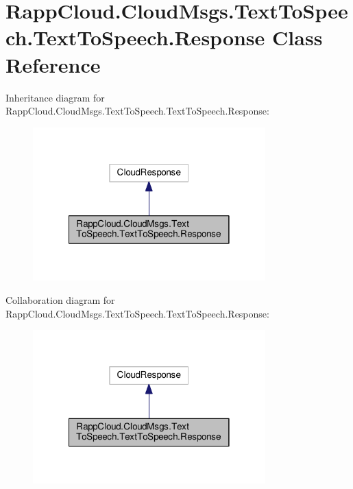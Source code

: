 \hypertarget{classRappCloud_1_1CloudMsgs_1_1TextToSpeech_1_1TextToSpeech_1_1Response}{\section{Rapp\-Cloud.\-Cloud\-Msgs.\-Text\-To\-Speech.\-Text\-To\-Speech.\-Response Class Reference}
\label{classRappCloud_1_1CloudMsgs_1_1TextToSpeech_1_1TextToSpeech_1_1Response}
}


Inheritance diagram for Rapp\-Cloud.\-Cloud\-Msgs.\-Text\-To\-Speech.\-Text\-To\-Speech.\-Response\-:
\nopagebreak
\begin{figure}[H]
\begin{center}
\leavevmode
\includegraphics[width=254pt]{classRappCloud_1_1CloudMsgs_1_1TextToSpeech_1_1TextToSpeech_1_1Response__inherit__graph}
\end{center}
\end{figure}


Collaboration diagram for Rapp\-Cloud.\-Cloud\-Msgs.\-Text\-To\-Speech.\-Text\-To\-Speech.\-Response\-:
\nopagebreak
\begin{figure}[H]
\begin{center}
\leavevmode
\includegraphics[width=254pt]{classRappCloud_1_1CloudMsgs_1_1TextToSpeech_1_1TextToSpeech_1_1Response__coll__graph}
\end{center}
\end{figure}
